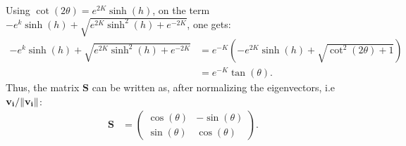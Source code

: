 \documentclass[a4paper]{article}
\begin{document}
Using $\cot(2\theta) = e^{2K}\sinh(h)$, on the term $-e^{k}\sinh(h) + \sqrt{e^{2K}\sinh^2(h) + e^{-2K}}$, one gets:
\begin{align*}
    -e^{k}\sinh(h) + \sqrt{e^{2K}\sinh^2(h) + e^{-2K}} &= e^{-K}\left(-e^{2K}\sinh(h) + \sqrt{\cot^2(2\theta) + 1}\right)\\
    &=e^{-K}\tan(\theta).
\end{align*}Thus, the matrix $\mathbf{S}$ can be written as, after normalizing the eigenvectors, i.e $\mathbf{v_{i}}/\norm{\mathbf{v_{i}}}$:
\begin{align*}
    \mathbf{S} &=\begin{pmatrix}
        \cos(\theta) & -\sin(\theta)\\
        \sin(\theta) &\cos(\theta)
    \end{pmatrix}.
\end{align*}
\end{document}
